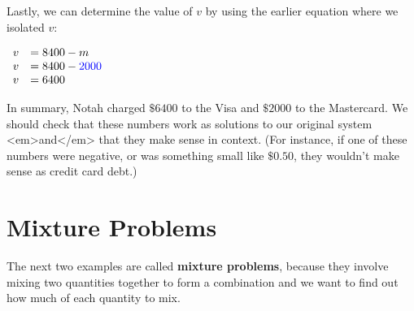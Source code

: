 \documentclass[nooutcomes]{ximera}
\begin{document}
\begin{example}
\begin{explanation}
          Lastly, we can determine the value of $v$ by using the earlier equation where we isolated $v$:
\begin{center}
$
  \begin{array}{rl}
            v&=8400-m\\
            v&=8400-{\color{blue}{{2000}}}\\
            v&=6400\\
\end{array}
$
\end{center}        
          In summary, Notah charged $\$6400$ to the Visa and $\$2000$ to the Mastercard.
          We should check that these numbers work as solutions to our original system <em>and</em>
          that they make sense in context.
          (For instance, if one of these numbers were negative,
          or was something small like $\$0.50$,
          they wouldn't make sense as credit card debt.)
  \end{explanation}
\end{example}

\section{Mixture Problems}
      The next two examples are called
      \textbf{mixture problems},
      because they involve mixing two quantities together to form a combination and we want to find out how much of each quantity to mix.
 
\end{document}
